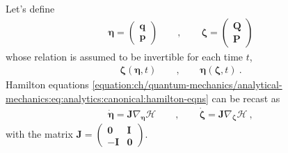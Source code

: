 \documentclass[letterpaper,10pt,english]{jupyterBook}
\begin{document}
\sphinxAtStartPar
Let’s define
\begin{equation*}
\begin{split}
\boldsymbol\eta = \begin{pmatrix} \mathbf{q} \\ \mathbf{p} \end{pmatrix} 
\qquad , \qquad
\boldsymbol\zeta = \begin{pmatrix} \mathbf{Q} \\ \mathbf{P} \end{pmatrix} 
\end{split}
\end{equation*}
\sphinxAtStartPar
whose relation is assumed to be invertible for each time \(t\),
\begin{equation}\label{equation:ch/quantum-mechanics/analytical-mechanics:eq:analytics:canonical:coord-transf}
\begin{split}\boldsymbol\zeta( \boldsymbol\eta, t) \qquad , \qquad \boldsymbol\eta ( \boldsymbol\zeta, t) \ . \end{split}
\end{equation}
\sphinxAtStartPar
{} Hamilton equations \eqref{equation:ch/quantum-mechanics/analytical-mechanics:eq:analytics:canonical:hamilton-eqns} can be recast as
\begin{equation}\label{equation:ch/quantum-mechanics/analytical-mechanics:eq:analytics:canonical:hamilton-eqns:simplectic}
\begin{split}
\dot{\boldsymbol{ \eta}} = \mathbf{J} \nabla_{\boldsymbol{ \eta}} \mathcal{H} \qquad , \qquad
\dot{\boldsymbol{\zeta}} = \mathbf{J} \nabla_{\boldsymbol{\zeta}} \mathscr{H} \ ,
\end{split}
\end{equation}
\sphinxAtStartPar
with the matrix \(\mathbf{J} = \begin{pmatrix} \mathbf{0} & \mathbf{I} \\ -\mathbf{I} & \mathbf{0} \end{pmatrix}\).
\end{document}
